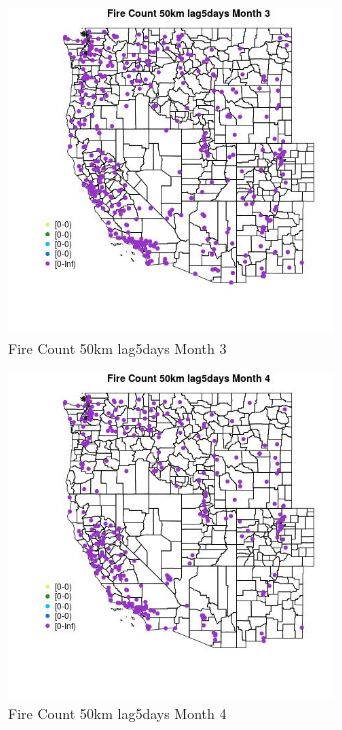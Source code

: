\begin{figure} 
\centering  
\includegraphics[width=0.77\textwidth]{Code_Outputs/Report_ML_input_PM25_Step4_part_e_de_duplicated_aves_compiled_2019-05-18wNAs_MapObsMo3Fire_Count_50km_lag5days.jpg} 
\caption{\label{fig:Report_ML_input_PM25_Step4_part_e_de_duplicated_aves_compiled_2019-05-18wNAsMapObsMo3Fire_Count_50km_lag5days}Fire Count 50km lag5days Month 3} 
\end{figure} 
 

\clearpage 

\begin{figure} 
\centering  
\includegraphics[width=0.77\textwidth]{Code_Outputs/Report_ML_input_PM25_Step4_part_e_de_duplicated_aves_compiled_2019-05-18wNAs_MapObsMo4Fire_Count_50km_lag5days.jpg} 
\caption{\label{fig:Report_ML_input_PM25_Step4_part_e_de_duplicated_aves_compiled_2019-05-18wNAsMapObsMo4Fire_Count_50km_lag5days}Fire Count 50km lag5days Month 4} 
\end{figure} 
 

